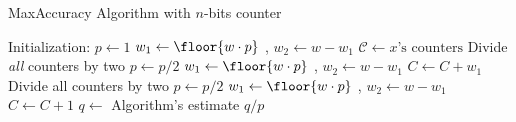 
\begin{algorithm}[ht]
\small
\caption {{\sc MaxAccuracy} Algorithm with $n$-bits counter\label{alg:maxACC}}
\begin{algorithmic}[1]
\Statex Initialization: $p\gets 1$
    \State $w_1\gets \floor{w\cdot p}$
    ,\quad{}
    $w_2\gets w-w_1$
    \State \label{linegenaccuracy}$\mathcal C\gets \mbox{$x$'s counters}$ 
    \label{line:maxACCOverflow1}
        \State Divide \emph{all} counters by two 
        \State $p\gets p/2$
        \State $w_1\gets \floor{w\cdot p}$
        ,\quad{}
        $w_2\gets w-w_1$\label{line:endMaxACCOverflow1}
    \EndWhile
        \State $C\gets C + w_1$
                \State Divide all counters by two
                \State $p\gets p/2$
                \State $w_1\gets \floor{w\cdot p}$
        ,\quad{}
        $w_2\gets w-w_1$
            \EndIf
            \State $C\gets C+1$
        \EndIf
    \EndFor
\EndProcedure
{}
    \State $q \gets$ Algorithm's estimate
    \State\Return $q/p$
\EndProcedure
\end{algorithmic}
\end{algorithm}


